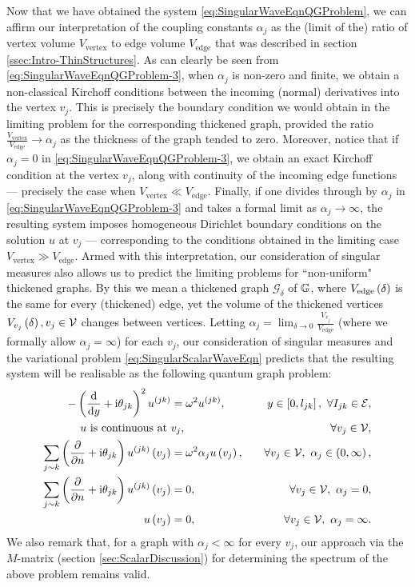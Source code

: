 Now that we have obtained the system \eqref{eq:SingularWaveEqnQGProblem}, we can affirm our interpretation of the coupling constants $\alpha_j$ as the (limit of the) ratio of vertex volume $V_{\mathrm{vertex}}$ to edge volume $V_{\mathrm{edge}}$ that was described in section \ref{ssec:Intro-ThinStructures}.
As can clearly be seen from \eqref{eq:SingularWaveEqnQGProblem-3}, when $\alpha_j$ is non-zero and finite, we obtain a non-classical Kirchoff conditions between the incoming (normal) derivatives into the vertex $v_j$.
This is precisely the boundary condition we would obtain in the limiting problem for the corresponding thickened graph, provided the ratio $\frac{V_{\mathrm{vertex}}}{V_{\mathrm{edge}}}\rightarrow\alpha_j$ as the thickness of the graph tended to zero.
Moreover, notice that if $\alpha_j=0$ in \eqref{eq:SingularWaveEqnQGProblem-3}, we obtain an exact Kirchoff condition at the vertex $v_j$, along with continuity of the incoming edge functions --- precisely the case when $V_{\mathrm{vertex}}\ll V_{\mathrm{edge}}$.
Finally, if one divides through by $\alpha_j$ in \eqref{eq:SingularWaveEqnQGProblem-3} and takes a formal limit as $\alpha_j\rightarrow\infty$, the resulting system imposes homogeneous Dirichlet boundary conditions on the solution $u$ at $v_j$ --- corresponding to the conditions obtained in the limiting case $V_{\mathrm{vertex}}\gg V_{\mathrm{edge}}$.
Armed with this interpretation, our consideration of singular measures also allows us to predict the limiting problems for ``non-uniform" thickened graphs.
By this we mean a thickened graph $\mathcal{G}_{\delta}$ of $\mathbb{G}$, where $V_{\mathrm{edge}}\left( \delta \right)$ is the same for every (thickened) edge, yet the volume of the thickened vertices $V_{v_j}\left( \delta \right), v_j\in\mathcal{V}$ changes between vertices.
Letting $\alpha_j = \lim_{\delta\rightarrow0}\frac{V_{v_j}}{V_{\mathrm{edge}}}$ (where we formally allow $\alpha_j=\infty$) for each $v_j$, our consideration of singular measures and the variational problem \eqref{eq:SingularScalarWaveEqn} predicts that the resulting system will be realisable as the following quantum graph problem:
\begin{subequations}
	\begin{align*}
		-\bracs{\diff{}{y} + \rmi\qm_{jk}}^2 u^{(jk)} &= \omega^2 u^{(jk)}, \quad & y\in\sqbracs{0,l_{jk}}, \ \forall I_{jk}\in\edgeSet, \\
		u \text{ is continuous at } & v_j, \quad &\forall v_j\in\vertSet, \\
		\sum_{j\con k}\bracs{\pdiff{}{n} + \rmi\qm_{jk}}u^{(jk)}\bracs{v_j} &= \omega^2\alpha_j u\bracs{v_j}, \quad &\forall v_j\in\vertSet, \ \alpha_j\in\bracs{0,\infty}, \\
		\sum_{j\con k}\bracs{\pdiff{}{n} + \rmi\qm_{jk}}u^{(jk)}\bracs{v_j} &= 0, \quad &\forall v_j\in\vertSet, \ \alpha_j = 0, \\
		u\bracs{v_j} &= 0, \quad &\forall v_j\in\vertSet, \ \alpha_j = \infty.
	\end{align*}
\end{subequations}
We also remark that, for a graph with $\alpha_j<\infty$ for every $v_j$, our approach via the $M$-matrix (section \ref{sec:ScalarDiscussion}) for determining the spectrum of the above problem remains valid.

